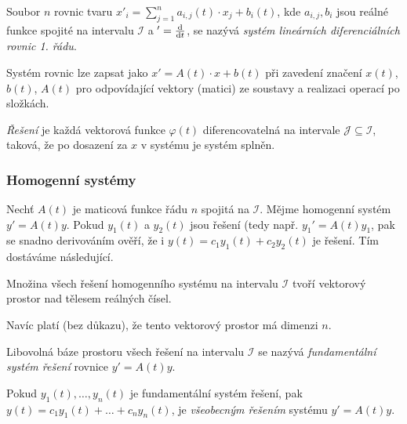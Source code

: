 \begin{definition}
    Soubor $n$ rovnic tvaru
    $x'_i = \sum_{j=1}^{n} a_{i,j}(t) \cdot x_j + b_i(t)$,
    kde $a_{i,j}, b_i$ jsou reálné funkce spojité na intervalu
    $\mathcal{I}$ a $' = \dv{}{t}$,
    se nazývá {\em systém lineárních diferenciálních rovnic 1. řádu}.

    Systém rovnic lze zapsat jako
    $x' = A(t) \cdot x + b(t)$
    při zavedení značení $x(t)$, $b(t)$, $A(t)$
    pro odpovídající vektory (matici) ze soustavy
    a realizaci operací po složkách.

    {\em Řešení} je každá vektorová funkce $\varphi(t)$
    diferencovatelná na intervale $\mathcal{J} \subseteq \mathcal{I}$,
    taková, že po dosazení za $x$ v systému je systém splněn.
\end{definition}

\subsubsection{Homogenní systémy}

Nechť $A(t)$ je maticová funkce řádu $n$ spojitá na $\mathcal{I}$.
Mějme homogenní systém $y' = A(t) y$.
Pokud $y_1(t)$ a $y_2(t)$ jsou řešení (tedy např. $y_1' = A(t) y_1$,
pak se snadno derivováním
ověří, že i $y(t) = c_1 y_1(t) + c_2 y_2(t)$ je řešení. Tím dostáváme
následující.

\begin{theorem}
    Množina všech řešení homogenního systému na intervalu $\mathcal{I}$
    tvoří vektorový prostor nad tělesem reálných čísel.
\end{theorem}

Navíc platí (bez důkazu), že tento vektorový prostor má dimenzi $n$.

\begin{definition}
    Libovolná báze prostoru všech řešení na intervalu $\mathcal{I}$ se
    nazývá {\em fundamentální systém řešení} rovnice $y' = A(t)y$.

\end{definition}

Pokud $y_1(t), \ldots, y_n(t)$ je fundamentální systém řešení, pak
$y(t) = c_1 y_1(t) + \ldots + c_n y_n(t)$, je {\em všeobecným
řešením} systému $y' = A(t) y$.

